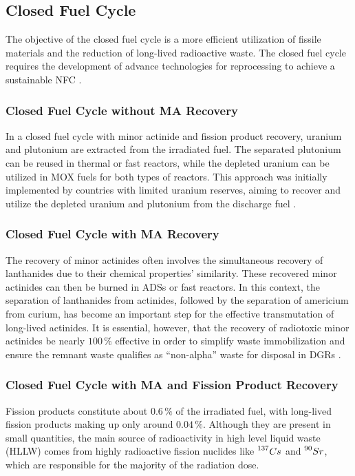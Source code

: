\subsection{Closed Fuel Cycle}

The objective of the closed fuel cycle is a more efficient utilization of fissile materials and the reduction of long-lived radioactive waste. The closed fuel cycle requires the development of advance technologies for reprocessing to achieve a sustainable NFC \cite{fuel_cycle_book}. 

\subsubsection{Closed Fuel Cycle without MA Recovery}

In a closed fuel cycle with minor actinide and fission product recovery, uranium and plutonium are extracted from the irradiated fuel. The separated plutonium can be reused in thermal or fast reactors, while the depleted uranium can be utilized in MOX fuels for both types of reactors. This approach was initially implemented by countries with limited uranium reserves, aiming to recover and utilize the depleted uranium and plutonium from the discharge fuel \cite{fuel_cycle_book}.


\subsubsection{Closed Fuel Cycle with MA Recovery}

The recovery of minor actinides often involves the simultaneous recovery of lanthanides due to their chemical properties' similarity. These recovered minor actinides can then be burned in ADSs or fast reactors. In this context, the separation of lanthanides from actinides, followed by the separation of americium from curium, has become an important step for the effective transmutation of long-lived actinides. It is essential, however, that the recovery of radiotoxic minor actinides be nearly \(100 \, \%\) effective in order to simplify waste immobilization and ensure the remnant waste qualifies as ``non-alpha'' waste for disposal in DGRs \cite{fuel_cycle_book}.

\subsubsection{Closed Fuel Cycle with MA and Fission Product Recovery}

Fission products constitute about \(0.6 \, \%\) of the irradiated fuel, with long-lived fission products making up only around \(0.04 \, \%\). Although they are present in small quantities, the main source of radioactivity in high level liquid waste (HLLW) comes from highly radioactive fission nuclides like \(\prescript{137}{}{Cs}\) and \(\prescript{90}{}{Sr}\), which are responsible for the majority of the radiation dose. 

